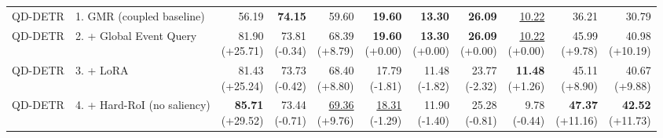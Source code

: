 \documentclass{article}
\begin{document}
{\begin{tabular}{llrrrrrrrrr}
\midrule
QD-DETR & 1. GMR (coupled baseline) & 56.19 & \textbf{74.15} & 59.60 & \textbf{19.60} & \textbf{13.30} & \textbf{26.09} & \underline{10.22} & 36.21 & 30.79 \\
QD-DETR & 2. + Global Event Query & \shortstack{81.90 \\ {\scriptsize (+25.71)}} & \shortstack{73.81 \\ {\scriptsize (-0.34)}} & \shortstack{68.39 \\ {\scriptsize (+8.79)}} & \shortstack{\textbf{19.60} \\ {\scriptsize (+0.00)}} & \shortstack{\textbf{13.30} \\ {\scriptsize (+0.00)}} & \shortstack{\textbf{26.09} \\ {\scriptsize (+0.00)}} & \shortstack{\underline{10.22} \\ {\scriptsize (+0.00)}} & \shortstack{45.99 \\ {\scriptsize (+9.78)}} & \shortstack{40.98 \\ {\scriptsize (+10.19)}} \\
QD-DETR & 3. + LoRA & \shortstack{81.43 \\ {\scriptsize (+25.24)}} & \shortstack{73.73 \\ {\scriptsize (-0.42)}} & \shortstack{68.40 \\ {\scriptsize (+8.80)}} & \shortstack{17.79 \\ {\scriptsize (-1.81)}} & \shortstack{11.48 \\ {\scriptsize (-1.82)}} & \shortstack{23.77 \\ {\scriptsize (-2.32)}} & \shortstack{\textbf{11.48} \\ {\scriptsize (+1.26)}} & \shortstack{45.11 \\ {\scriptsize (+8.90)}} & \shortstack{40.67 \\ {\scriptsize (+9.88)}} \\
QD-DETR & 4. + Hard-RoI (no saliency) & \shortstack{\textbf{85.71} \\ {\scriptsize (+29.52)}} & \shortstack{73.44 \\ {\scriptsize (-0.71)}} & \shortstack{\underline{69.36} \\ {\scriptsize (+9.76)}} & \shortstack{\underline{18.31} \\ {\scriptsize (-1.29)}} & \shortstack{11.90 \\ {\scriptsize (-1.40)}} & \shortstack{25.28 \\ {\scriptsize (-0.81)}} & \shortstack{9.78 \\ {\scriptsize (-0.44)}} & \shortstack{\textbf{47.37} \\ {\scriptsize (+11.16)}} & \shortstack{\textbf{42.52} \\ {\scriptsize (+11.73)}} \\

\end{tabular}}
\end{document}

